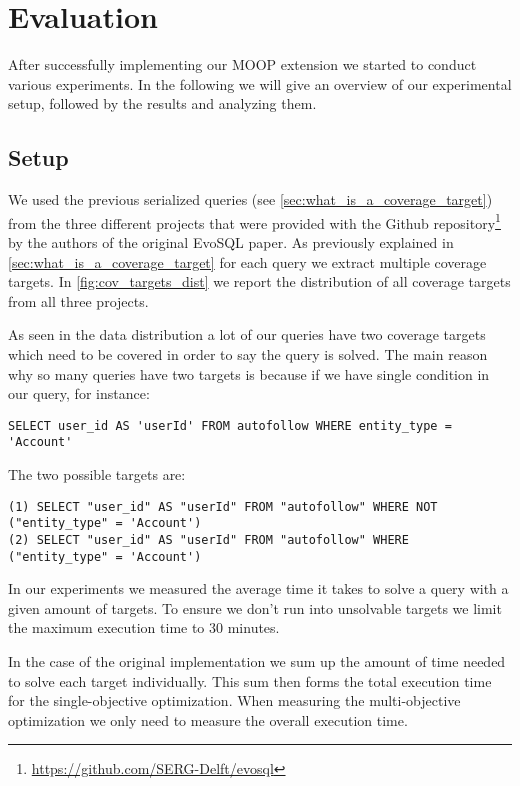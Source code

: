 \chapter{Evaluation}
\label{cha:evaluation}

After successfully implementing our MOOP extension we started to conduct various experiments. In the following we will give an overview of our experimental setup, followed by the results and analyzing them.

\section{Setup}
\label{sec:experimental_setup}
We used the previous serialized queries (see \cref{sec:what_is_a_coverage_target}) from the three different projects that were provided with the Github repository\footnote[2]{\href{https://github.com/SERG-Delft/evosql}{https://github.com/SERG-Delft/evosql}} by the authors of the original EvoSQL paper. As previously explained in \cref{sec:what_is_a_coverage_target} for each query we extract multiple coverage targets. In \cref{fig:cov_targets_dist} we report the distribution of all coverage targets from all three projects.

As seen in the data distribution a lot of our queries have two coverage targets which need to be covered in order to say the query is solved. The main reason why so many queries have two targets is because if we have single condition in our query, for instance:
\begin{verbatim}
SELECT user_id AS 'userId' FROM autofollow WHERE entity_type = 'Account'
\end{verbatim}

The two possible targets are:
\begin{verbatim}
(1) SELECT "user_id" AS "userId" FROM "autofollow" WHERE NOT ("entity_type" = 'Account')
(2) SELECT "user_id" AS "userId" FROM "autofollow" WHERE ("entity_type" = 'Account')
\end{verbatim}

In our experiments we measured the average time it takes to solve a query with a given amount of targets. To ensure we don't run into unsolvable targets we limit the maximum execution time to 30 minutes.

In the case of the original implementation we sum up the amount of time needed to solve each target individually. This sum then forms the total execution time for the single-objective optimization. When measuring the multi-objective optimization we only need to measure the overall execution time.

